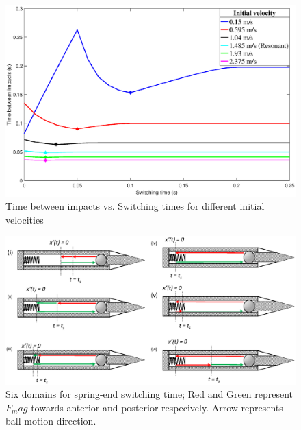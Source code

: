 \documentclass[letterpaper, 10 pt, conference]{ieeeconf}  %
\begin{document}
\begin{figure}
	\includegraphics[width=\linewidth]{delTvsTs_R1.eps}
	\caption{Time between impacts vs. Switching times for different initial velocities}
	\label{delTvsTs}
\end{figure}

\begin{figure}
	\includegraphics[width=\linewidth]{Tswitch_cases_1to6.eps}
	\caption{Six domains for spring-end switching time; Red and Green represent $F_mag$ towards anterior and posterior respecively. Arrow represents ball motion direction.}
	\label{Tswitch}
\end{figure}
\end{document}
